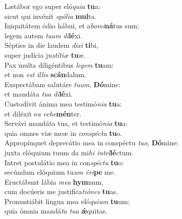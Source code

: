 \evenverse Lætábor ego super eló\textit{qui}\textit{a} \textbf{tu}a:~\*\\
\evenverse sicut qui invénit \textit{spó}\textit{li}\textit{a} \textbf{mul}ta.\\
\oddverse Iniquitátem ódio hábui, et a\textit{bo}\textit{mi}\textbf{ná}tus sum:~\*\\
\oddverse legem autem \textit{tu}\textit{am} \textit{di}\textbf{lé}xi.\\
\evenverse Sépties in die laudem \textit{di}\textit{xi} \textbf{ti}bi,~\*\\
\evenverse super judícia ju\textit{stí}\textit{ti}\textit{æ} \textbf{tu}æ.\\
\oddverse Pax multa diligéntibus \textit{le}\textit{gem} \textbf{tu}am:~\*\\
\oddverse et non \textit{est} \textit{il}\textit{lis} \textbf{scán}dalum.\\
\evenverse Exspectábam salutáre \textit{tu}\textit{um}, \textbf{Dó}mine:~\*\\
\evenverse et mandáta \textit{tu}\textit{a} \textit{di}\textbf{lé}xi.\\
\oddverse Custodívit ánima mea testimó\textit{ni}\textit{a} \textbf{tu}a:~\*\\
\oddverse et diléxit e\textit{a} \textit{ve}\textit{he}\textbf{mén}ter.\\
\evenverse Servávi mandáta tua, et testimó\textit{ni}\textit{a} \textbf{tu}a:~\*\\
\evenverse quia omnes viæ meæ in \textit{con}\textit{spé}\textit{ctu} \textbf{tu}o.\\
\oddverse Appropínquet deprecátio mea in conspéctu \textit{tu}\textit{o}, \textbf{Dó}mine:~\*\\
\oddverse juxta elóquium tuum da mi\textit{hi} \textit{in}\textit{tel}\textbf{lé}ctum.\\
\evenverse Intret postulátio mea in con\textit{spé}\textit{ctu} \textbf{tu}o:~\*\\
\evenverse secúndum elóquium tu\textit{um} \textit{é}\textit{ri}\textbf{pe} me.\\
\oddverse Eructábunt lábia \textit{me}\textit{a} \textbf{hym}num,~\*\\
\oddverse cum docúeris me justifica\textit{ti}\textit{ó}\textit{nes} \textbf{tu}as.\\
\evenverse Pronuntiábit lingua mea eló\textit{qui}\textit{um} \textbf{tu}um:~\*\\
\evenverse quia ómnia mandá\textit{ta} \textit{tu}\textit{a} \textbf{ǽ}quitas.\\
